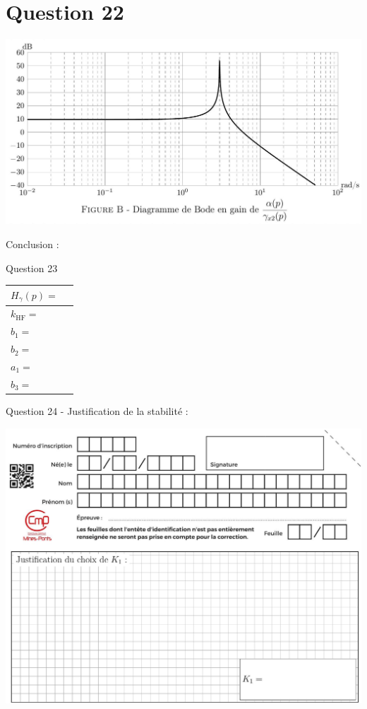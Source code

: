 \documentclass[10pt]{article}
\begin{document}
\section*{Question 22}
\begin{center}
\includegraphics[max width=\textwidth]{2024_04_26_3285cfc264024262add0g-30(1)}
\end{center}

Conclusion :

Question 23

\begin{center}
\begin{tabular}{|l|l|}
\hline
$H_{\gamma}(p)=$ \\
\hline
$k_{\mathrm{HF}}=$ \\
\hline
$b_{1}=$ \\
\hline
$b_{2}=$ \\
\hline
$a_{1}=$ \\
\hline
$b_{3}=$ \\
\hline
\end{tabular}
\end{center}

Question 24 - Justification de la stabilité :

\begin{center}
\includegraphics[max width=\textwidth]{2024_04_26_3285cfc264024262add0g-32}
\end{center}
\end{document}
